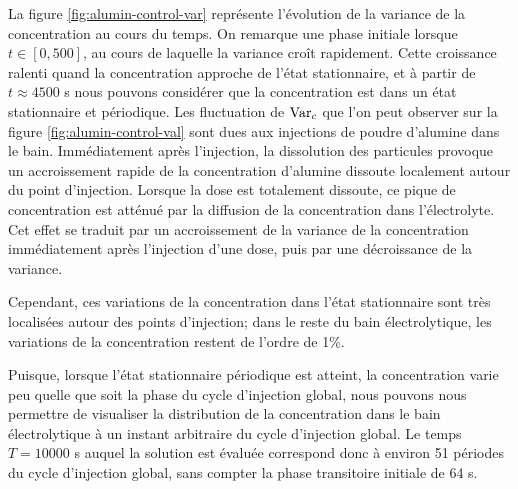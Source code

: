 La figure \ref{fig:alumin-control-var} représente l'évolution de
la variance de la concentration au cours du temps. On remarque une
phase initiale lorsque $t\in[0,500]$, au cours de laquelle la variance
croît rapidement. Cette croissance ralenti quand la concentration
approche de l'état stationnaire, et à partir de $t \approx
\num{4500}$ \si{\second} nous pouvons considérer que la
concentration est dans un état stationnaire et périodique. Les
fluctuation de $\operatorname{Var}_c$ que l'on peut observer sur la
figure \ref{fig:alumin-control-val} sont dues aux injections de poudre
d'alumine dans le bain. Immédiatement après l'injection, la
dissolution des particules provoque un accroissement rapide de la
concentration d'alumine dissoute localement autour du point
d'injection. Lorsque la dose est totalement dissoute, ce pique de
concentration est atténué par la diffusion de la concentration
dans l'électrolyte. Cet effet se traduit par un accroissement de la
variance de la concentration immédiatement après l'injection d'une
dose, puis par une décroissance de la variance.

Cependant, ces variations de la concentration dans l'état
stationnaire sont très localisées autour des points d'injection; dans
le reste du bain électrolytique, les variations de la concentration
restent de l'ordre de \num{1}\%.

Puisque, lorsque l'état stationnaire périodique est atteint, la
concentration varie peu quelle que soit la phase du cycle d'injection
global, nous pouvons nous permettre de visualiser la distribution de
la concentration dans le bain électrolytique à un instant
arbitraire du cycle d'injection global. Le temps $T = \num{10000}$
\si{\second} auquel la solution est évaluée correspond donc à environ
\num{51} périodes du cycle d'injection global, sans compter la phase
transitoire initiale de \num{64} \si{\second}.

